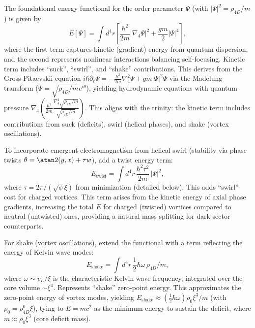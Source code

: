 The foundational energy functional for the order parameter $\Psi$ (with $|\Psi|^2 = \rho_{4D}/m$) is given by
\begin{equation}
E[\Psi] = \int d^4 r \left[ \frac{\hbar^2}{2m} |\nabla_4 \Psi|^2 + \frac{g m}{2} |\Psi|^4 \right],
\end{equation}
where the first term captures kinetic (gradient) energy from quantum dispersion, and the second represents nonlinear interactions balancing self-focusing. Kinetic term includes ``suck'', ``swirl'', and ``shake'' contributions. This derives from the Gross-Pitaevskii equation $i \hbar \partial_t \Psi = -\frac{\hbar^2}{2 m} \nabla_4^2 \Psi + g m |\Psi|^2 \Psi$ via the Madelung transform ($\Psi = \sqrt{\rho_{4D}/m} e^{i \theta}$), yielding hydrodynamic equations with quantum pressure $\nabla_4 \left( \frac{\hbar^2}{2 m} \frac{\nabla_4^2 \sqrt{\rho_{4D}/m}}{\sqrt{\rho_{4D}/m}} \right)$. This aligns with the trinity: the kinetic term includes contributions from suck (deficits), swirl (helical phases), and shake (vortex oscillations).

To incorporate emergent electromagnetism from helical swirl (stability via phase twists $\theta = \atan2(y, x) + \tau w$), add a twist energy term:
\begin{equation}
E_{\text{twist}} = \int d^4 r \, \frac{\hbar^2 \tau^2}{2m} \, |\Psi|^2,
\end{equation}
where $\tau = 2\pi / (\sqrt{\phi} \xi)$ from minimization (detailed below). This adds ``swirl'' cost for charged vortices. This term arises from the kinetic energy of axial phase gradients, increasing the total $E$ for charged (twisted) vortices compared to neutral (untwisted) ones, providing a natural mass splitting for dark sector counterparts.

For shake (vortex oscillations), extend the functional with a term reflecting the energy of Kelvin wave modes:
\begin{equation}
E_{\text{shake}} = \int d^4 r \, \frac{1}{2} \hbar \omega \, \rho_{4D} / m,
\end{equation}
where $\omega \sim v_L / \xi$ is the characteristic Kelvin wave frequency, integrated over the core volume $\sim \xi^4$. Represents ``shake'' zero-point energy. This approximates the zero-point energy of vortex modes, yielding $E_{\text{shake}} \approx (\frac{1}{2} \hbar \omega) \rho_0 \xi^3 / m$ (with $\rho_0 = \rho_{4D}^0 \xi$), tying to $E = m c^2$ as the minimum energy to sustain the deficit, where $m \approx \rho_0 \xi^3$ (core deficit mass).

